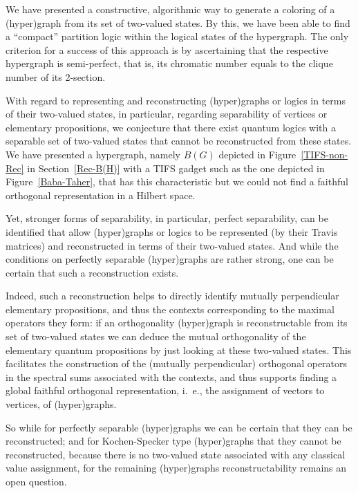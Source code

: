 \documentclass[%
12pt,
prereprint,
showpacs,
showkeys,
preprintnumbers,
amsmath,amssymb,
aps,
pra,
longbibliography,
notitlepage
]{revtex4-1}
\theoremstyle{definition}
\begin{document}
        We have presented a constructive, algorithmic way to generate a coloring of a (hyper)graph from its set of two-valued states. By this, we have been able to find a ``compact'' partition logic within the logical states of the hypergraph. The only criterion for a success of this approach is by ascertaining that the respective hypergraph is semi-perfect, that is, its chromatic number equals to the clique number of its 2-section.

        With regard to representing and reconstructing (hyper)graphs or logics in terms of their two-valued states, in particular, regarding separability of vertices or elementary propositions, we conjecture that there exist quantum logics with a separable set of two-valued states that cannot be reconstructed from these states. We have presented a hypergraph, namely  $B(G)$ depicted in Figure~\ref{TIFS-non-Rec} in Section~\ref{Rec-B(H)} with a TIFS gadget such as the one depicted in Figure~\ref{Baba-Taher}, that has this characteristic but we could not find a faithful orthogonal representation in a Hilbert space.

        Yet, stronger forms of separability, in particular, perfect separability, can be identified that allow (hyper)graphs or logics to be represented (by their Travis matrices) and reconstructed in terms of their two-valued states. And while the conditions on perfectly separable (hyper)graphs are rather strong, one can be certain that such a reconstruction exists.

        Indeed, such a reconstruction helps to directly identify mutually perpendicular elementary propositions, and thus the contexts corresponding to the maximal operators they form: if an orthogonality (hyper)graph is reconstructable from its set of two-valued states we can deduce the mutual orthogonality of the elementary quantum propositions by just looking at these two-valued states. This facilitates the construction of the (mutually perpendicular) orthogonal operators in the spectral sums associated with the contexts, and thus supports finding a global faithful orthogonal representation, i.~e., the assignment of vectors to vertices, of (hyper)graphs.

        So while for perfectly separable (hyper)graphs we can be certain that they can be reconstructed; and for Kochen-Specker type (hyper)graphs that they cannot be reconstructed, because there is no two-valued state associated with any classical value assignment, for the remaining (hyper)graphs reconstructability remains an open question.
\end{document}
